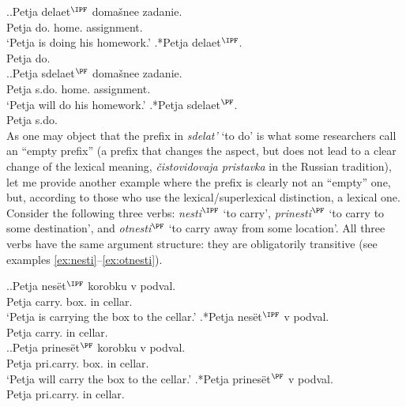 \ex.\label{ex:delat}\ag.Petja delaet$^{\IPF}$ doma\v{s}nee zadanie.\\
Petja do. home. assignment.\\
\trans `Petja is doing his homework.'
\bg.*Petja delaet$^{\IPF}$.\\
Petja do.\\

\ex.\label{ex:sdelat}\ag.Petja sdelaet$^{\PF}$ doma\v{s}nee zadanie.\\
Petja s.do. home. assignment.\\
\trans `Petja will do his homework.'
\bg.*Petja sdelaet$^{\PF}$.\\
Petja s.do.\\


As one may object that the prefix  in \textit{sdelat'} `to do' is what some researchers call an ``empty prefix'' (a prefix that changes the aspect, but does not lead to a clear change of the lexical meaning, \textit{\v{c}istovidovaja pristavka} in the Russian tradition), let me provide another example where the prefix is clearly not an ``empty'' one, but, according to those who use the lexical/superlexical distinction, a lexical one.  Consider the following three verbs: \textit{nesti}$^{\IPF}$ `to carry', \textit{prinesti}$^{\PF}$ `to carry to some destination',  and \textit{otnesti}$^{\PF}$ `to carry away from some location'. All three verbs have the same argument structure: they are obligatorily transitive (see examples \ref{ex:nesti}--\ref{ex:otnesti}).

\ex.\label{ex:nesti}\ag.Petja nes\"{e}t$^{\IPF}$ korobku v podval.\\
Petja carry. box. in cellar.\\
\trans `Petja is carrying the box to the cellar.'
\bg.*Petja nes\"{e}t$^{\IPF}$ v podval.\\
Petja carry. in cellar.\\

\ex.\label{ex:prinesti}\ag.Petja prines\"{e}t$^{\PF}$ korobku v podval.\\
Petja pri.carry. box. in cellar.\\
\trans `Petja will carry the box to the cellar.'
\bg.*Petja prines\"{e}t$^{\PF}$ v podval.\\
Petja pri.carry. in cellar.\\

